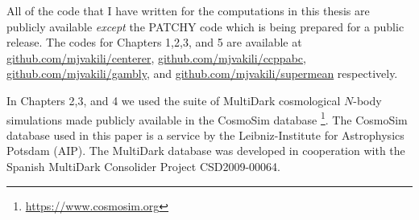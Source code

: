 All of the code that I have written for the computations in this thesis are publicly available \emph{except} the PATCHY code which is being prepared for a public release. 
The codes for Chapters 1,2,3, and 5 are available at \url{github.com/mjvakili/centerer}, \url{github.com/mjvakili/ccppabc}, \url{github.com/mjvakili/gambly}, and \url{github.com/mjvakili/supermean} respectively.




In Chapters 2,3, and 4 we used the suite of MultiDark cosmological $N$-body simulations made publicly available in the CosmoSim database \footnote{\url{https://www.cosmosim.org}}. The CosmoSim database used in this paper is a service by the Leibniz-Institute for Astrophysics Potsdam (AIP). The MultiDark database was developed in cooperation with the Spanish MultiDark Consolider Project CSD2009-00064.

